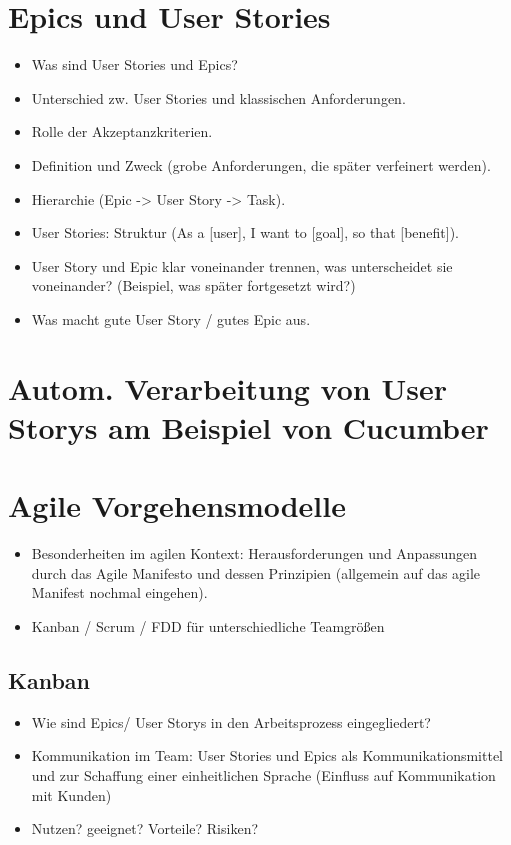 \documentclass[acmtog]{acmart}
\begin{document}
\section{Epics und User Stories}
\begin{itemize}
	\item Was sind User Stories und Epics?
	\item Unterschied zw. User Stories und klassischen Anforderungen.
	\item Rolle der Akzeptanzkriterien.
	\item Definition und Zweck (grobe Anforderungen, die später verfeinert werden).
	\item Hierarchie (Epic -> User Story -> Task).
	\item User Stories: Struktur (As a [user], I want to [goal], so that [benefit]).
	\item User Story und Epic klar voneinander trennen, was unterscheidet sie voneinander?
				(Beispiel, was später fortgesetzt wird?)
	\item Was macht gute User Story / gutes Epic aus.
\end{itemize}

\section{Autom. Verarbeitung von User Storys am Beispiel von Cucumber}

\section{Agile Vorgehensmodelle}

\begin{itemize}
	\item Besonderheiten im agilen Kontext: Herausforderungen und Anpassungen durch das Agile Manifesto und dessen Prinzipien (allgemein auf das agile Manifest nochmal eingehen).
	\item Kanban / Scrum / FDD für unterschiedliche Teamgrößen
\end{itemize}

\subsection{Kanban}
	\begin{itemize}
		\item Wie sind Epics/ User Storys in den Arbeitsprozess eingegliedert?
		\item Kommunikation im Team: User Stories und Epics als Kommunikationsmittel und zur Schaffung einer einheitlichen Sprache (Einfluss auf Kommunikation mit Kunden)
		\item Nutzen? geeignet? Vorteile? Risiken?
	\end{itemize}
\end{document}
